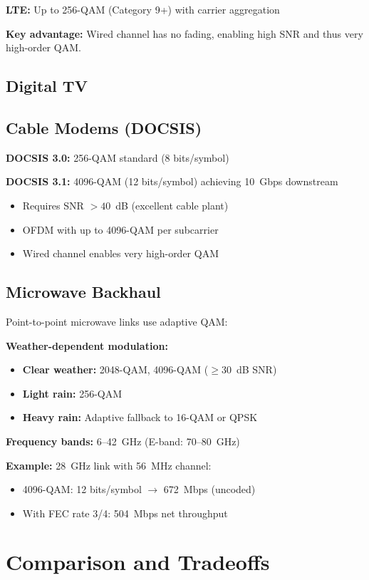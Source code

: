 \textbf{LTE:} Up to 256-QAM (Category 9+) with carrier aggregation

\textbf{Key advantage:} Wired channel has no fading, enabling high SNR and thus very high-order QAM.

\subsection{Digital TV}

\subsection{Cable Modems (DOCSIS)}

\textbf{DOCSIS 3.0:} 256-QAM standard (8 bits/symbol)

\textbf{DOCSIS 3.1:} 4096-QAM (12 bits/symbol) achieving 10~Gbps downstream
\begin{itemize}
\item Requires SNR $> 40$~dB (excellent cable plant)
\item OFDM with up to 4096-QAM per subcarrier
\item Wired channel enables very high-order QAM
\end{itemize}

\subsection{Microwave Backhaul}

Point-to-point microwave links use adaptive QAM:

\textbf{Weather-dependent modulation:}
\begin{itemize}
\item \textbf{Clear weather:} 2048-QAM, 4096-QAM ($\geq 30$~dB SNR)
\item \textbf{Light rain:} 256-QAM
\item \textbf{Heavy rain:} Adaptive fallback to 16-QAM or QPSK
\end{itemize}

\textbf{Frequency bands:} 6--42~GHz (E-band: 70--80~GHz)

\textbf{Example:} 28~GHz link with 56~MHz channel:
\begin{itemize}
\item 4096-QAM: 12 bits/symbol $\rightarrow$ 672~Mbps (uncoded)
\item With FEC rate 3/4: 504~Mbps net throughput
\end{itemize}

\section{Comparison and Tradeoffs}

